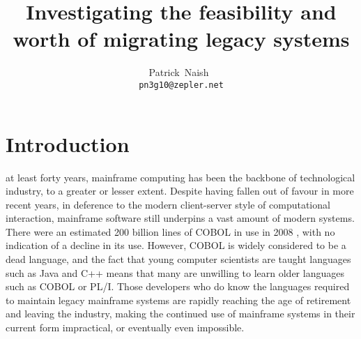 \documentclass[12pt,journal,compsoc]{IEEEtran}
\begin{document}
\title{Investigating the feasibility and worth of migrating legacy systems}
\author{Patrick~Naish~\\\texttt{pn3g10@zepler.net}}




\maketitle

\IEEEdisplaynotcompsoctitleabstractindextext

\IEEEpeerreviewmaketitle

\section{Introduction}
\label{sec:introduction}

 at least forty years, mainframe computing has been the backbone of technological industry, to a greater or lesser extent. Despite having fallen out of favour in more recent years, in deference to the modern client-server style of computational interaction, mainframe software still underpins a vast amount of modern systems. There were an estimated 200 billion lines of COBOL in use in 2008 \cite{Datamonitor2008}, with no indication of a decline in its use. However, COBOL is widely considered to be a dead language, and the fact that young computer scientists are taught languages such as Java \cite{Sneed2013} and C++ means that many are unwilling to learn older languages such as COBOL or PL/I. Those developers who do know the languages required to maintain legacy mainframe systems are rapidly reaching the age of retirement and leaving the industry, making the continued use of mainframe systems in their current form impractical, or eventually even impossible.
\end{document}
